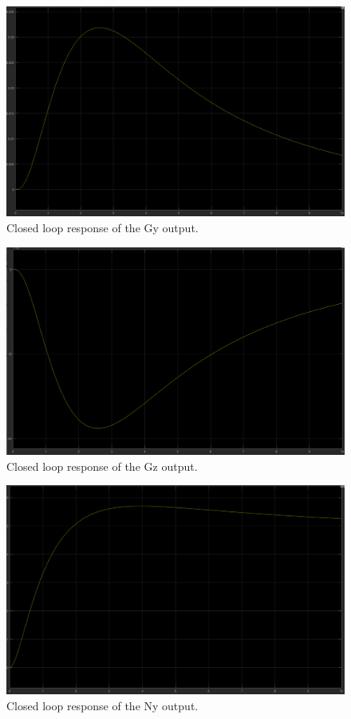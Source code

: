 \begin{figure}[H]
  \centering
    \includegraphics[width=1\textwidth]{images/closedloopGystep.png}
	\caption{Closed loop response of the Gy output.}
	\label{closedloop3}
\end{figure}

\begin{figure}[H]
  \centering
    \includegraphics[width=1\textwidth]{images/closedloopGzstep.png}
	\caption{Closed loop response of the Gz output.}
	\label{closedloop4}
\end{figure}

\begin{figure}[H]
  \centering
    \includegraphics[width=1\textwidth]{images/closedloopNystep.png}
	\caption{Closed loop response of the Ny output.}
	\label{closedloop5}
\end{figure}


